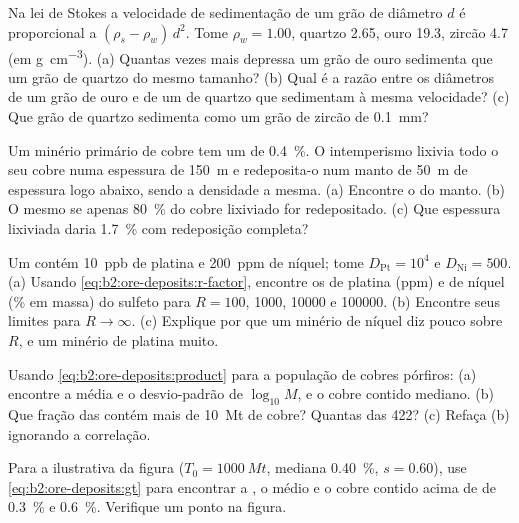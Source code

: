 \begin{exercise}[$\star$]\label{exo:b2:ore-deposits:3}
Na lei de Stokes a velocidade de sedimentação de um grão de diâmetro $d$ é proporcional a $(\rho_s -
\rho_w)\,d^2$. Tome $\rho_w = 1.00$, quartzo 2.65, ouro 19.3, zircão 4.7 (em
\unit{g.cm^{-3}}). (a) Quantas vezes mais depressa um grão de ouro sedimenta que um grão de quartzo do
mesmo tamanho? (b) Qual é a razão entre os diâmetros de um grão de ouro e de um de quartzo que sedimentam à
mesma velocidade? (c) Que grão de quartzo sedimenta como um grão de zircão de \qty{0.1}{mm}?
\end{exercise}

\begin{exercise}[$\star$]\label{exo:b2:ore-deposits:4}
Um minério primário de cobre tem um  de \qty{0.4}{\percent}. O intemperismo lixivia todo o seu cobre numa
espessura de \qty{150}{m} e redeposita-o num manto de \qty{50}{m} de espessura logo abaixo, sendo a densidade
a mesma. (a) Encontre o  do manto. (b) O mesmo se apenas \qty{80}{\percent} do
cobre lixiviado for redepositado. (c) Que espessura lixiviada daria \qty{1.7}{\percent} com
redeposição completa?
\end{exercise}

\begin{exercise}[$\star\star$]\label{exo:b2:ore-deposits:5}
Um  contém \qty{10}{ppb} de platina e \qty{200}{ppm} de níquel; tome $D_{\mathrm{Pt}} =
10^4$ e $D_{\mathrm{Ni}} = 500$. (a) Usando \eqref{eq:b2:ore-deposits:r-factor}, encontre os  de
platina (ppm) e de níquel (\% em massa) do sulfeto para $R = 100$, \num{1000}, \num{10000}
e \num{100000}. (b) Encontre seus limites para $R \to \infty$. (c) Explique por que um minério de níquel diz
pouco sobre $R$, e um minério de platina muito.
\end{exercise}

\begin{exercise}[$\star\star$]\label{exo:b2:ore-deposits:6}
Usando \eqref{eq:b2:ore-deposits:product} para a população de cobres pórfiros: (a) encontre a média e o
desvio-padrão de $\log_{10} M$, e o cobre contido mediano. (b) Que fração das 
contém mais de \qty{10}{Mt} de cobre? Quantas das 422? (c) Refaça (b) ignorando a correlação.
\end{exercise}

\begin{exercise}[$\star\star$]\label{exo:b2:ore-deposits:7}
Para a  ilustrativa da figura ($T_0 = \qty{1000}{Mt}$, mediana \qty{0.40}{\percent},
$s = 0.60$), use \eqref{eq:b2:ore-deposits:gt} para encontrar a , o  médio e o cobre contido
acima de  de \qty{0.3}{\percent} e \qty{0.6}{\percent}. Verifique um ponto na figura.
\end{exercise}

